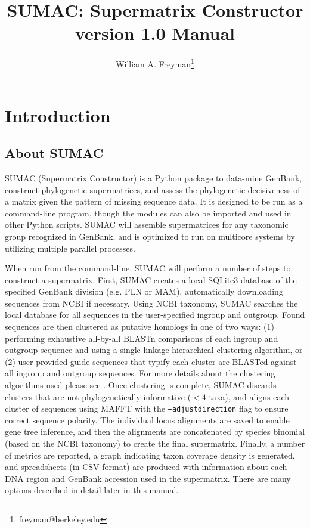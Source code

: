 \documentclass[10pt]{report}
\title{SUMAC: Supermatrix Constructor version 1.0 Manual}
\author{William A. Freyman\thanks{freyman@berkeley.edu}}
\affil{Department of Integrative Biology, University of California, Berkeley}
\date{}
\begin{document}
\maketitle

\tableofcontents


\chapter{Introduction}

\section{About SUMAC}

SUMAC (Supermatrix Constructor) is a Python package to 
data-mine GenBank, construct phylogenetic supermatrices, and assess the phylogenetic decisiveness of a matrix given the pattern of missing sequence data.
It is designed to be run as a command-line program, though
the modules can also be imported and used in other Python scripts.
SUMAC will assemble
supermatrices for any taxonomic group recognized in GenBank,
and is optimized to run on multicore systems by utilizing multiple parallel processes.

When run from the command-line, SUMAC will perform a number of steps to construct
a supermatrix.
First, SUMAC creates a local SQLite3 \citep{sqlite} database of the specified GenBank division (e.g. PLN or MAM),
automatically downloading sequences from NCBI if necessary.
Using NCBI taxonomy, SUMAC searches the local database for all sequences in the user-specified ingroup
and outgroup.
Found sequences are then clustered as putative homologs in one of two ways:
(1) performing exhaustive all-by-all BLASTn \citep{blast} comparisons of each ingroup and outgroup sequence
and using a single-linkage hierarchical clustering algorithm, or
(2) user-provided guide sequences that typify each cluster are BLASTed against all ingroup and outgroup sequences.
For more details about the clustering algorithms used please see \citet{sumac}.
Once clustering is complete, SUMAC discards clusters that are not phylogenetically informative ($< 4$ taxa),
and aligns each cluster of sequences using MAFFT \citep{katoh2002mafft} with the \texttt{--adjustdirection} flag
to ensure correct sequence polarity.
The individual locus alignments are saved to enable gene tree inference,
and then the alignments are concatenated by species binomial (based on the NCBI taxonomy)
to create the final supermatrix.
Finally, a number of metrics are reported,
a graph indicating taxon coverage density is generated, and spreadsheets (in CSV format)
are produced with information about each DNA region and GenBank accession used in
the supermatrix.
There are many options described in
detail later in this manual. 
\end{document}
